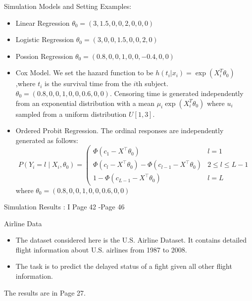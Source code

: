 \documentclass[11pt]{beamer}
\begin{document}
\begin{frame}{Simulation Models and Setting}
Examples:
\begin{itemize}
\item Linear Regression $\theta_0=(3,1.5,0,0,2,0,0,0)$
\item Logistic Regression $\theta_0=(3,0,0,1.5,0,0,2,0)$
\item Possion Regression $\theta_0=(0.8, 0, 0, 1, 0, 0,-0.4, 0, 0)$
\item Cox Model. We set the hazard function to be $h(t_i|x_i)=\exp(X_i^T\theta_0)$,where $t_i$ is the survival time from the $i$th subject. $\theta_0=(0.8, 0, 0, 1, 0, 0,0.6, 0, 0)$. Censoring time is generated independently
from an exponential distribution with a mean $\mu_i \exp(X_i^T\theta_0)$ where $u_i$  sampled
from a uniform distribution $U[1,3]$.
\item Ordered Probit Regression. The ordinal responses are independently generated as
follows:
$$
P\left(Y_{i}=l \mid X_{i}, \theta_{0}\right)=\left(\begin{array}{ll}
\Phi\left(c_{1}-X^{\top} \theta_{0}\right) & l=1 \\
\Phi\left(c_{l}-X^{\top} \theta_{0}\right)-\Phi\left(c_{l-1}-X^{\top} \theta_{0}\right) &  2 \leq l \leq L-1 \\
1-\Phi\left(c_{L-1}-X^{\top} \theta_{0}\right)  & l=L
\end{array}\right.
$$
where $\theta_0=(0.8, 0, 0, 1, 0, 0,0.6, 0, 0)$
\end{itemize}
\end{frame}


\begin{frame}{Simulation Results : I}
Page 42 -Page 46
\end{frame}


\begin{frame}{Airline Data}
\begin{itemize}
\item The dataset considered here is the U.S. Airline Dataset. It contains detailed flight  information about
U.S. airlines from 1987 to 2008.
\item The task is to predict the delayed status of a 
fight given all other flight information.
\end{itemize}

The results are in Page 27.
\end{frame}
\end{document}
